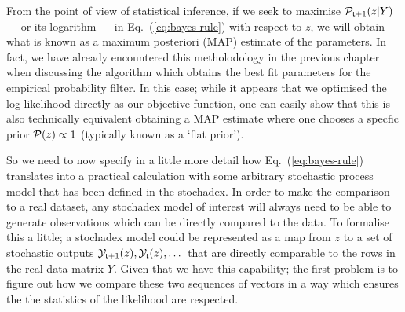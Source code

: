 From the point of view of statistical inference, if we seek to maximise ${\cal P}_{{\sf t}+1}(z \vert Y)$ --- or its logarithm --- in Eq.~(\ref{eq:bayes-rule}) with respect to $z$, we will obtain what is known as a maximum posteriori (MAP) estimate of the parameters. In fact, we have already encountered this metholodology in the previous chapter when discussing the algorithm which obtains the best fit parameters for the empirical probability filter. In this case; while it appears that we optimised the log-likelihood directly as our objective function, one can easily show that this is also technically equivalent obtaining a MAP estimate where one chooses a specfic prior ${\cal P} (z) \propto 1$ (typically known as a `flat prior').

So we need to now specify in a little more detail how Eq.~(\ref{eq:bayes-rule}) translates into a practical calculation with some arbitrary stochastic process model that has been defined in the stochadex. In order to make the comparison to a real dataset, any stochadex model of interest will always need to be able to generate observations which can be directly compared to the data. To formalise this a little; a stochadex model could be represented as a map from $z$ to a set of stochastic outputs ${\cal Y}_{{\sf t}+1}(z), {\cal Y}_{{\sf t}}(z), \dots$ that are directly comparable to the rows in the real data matrix $Y$. Given that we have this capability; the first problem is to figure out how we compare these two sequences of vectors in a way which ensures the the statistics of the likelihood are respected. 

